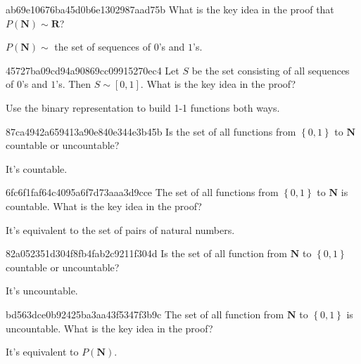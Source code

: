 \begin{note}{ab69e10676ba45d0b6e1302987aad75b}
    What is the key idea in the proof that \({ P(\mathbf{N}) \sim \mathbf{R} }\)?

    \begin{cloze}{1}
        \({ P(\mathbf{N}) \sim }\) the set of sequences of \({ 0 }\)'s and \({ 1 }\)'s.
    \end{cloze}
\end{note}

\begin{note}{45727ba09cd94a90869cc09915270ec4}
    Let \({ S }\) be the set consisting of all sequences of \({ 0 }\)'s and \({ 1 }\)'s.
    Then \({ S \sim [0, 1] }\).
    What is the key idea in the proof?

    \begin{cloze}{1}
        Use the binary representation to build 1-1 functions both ways.
    \end{cloze}
\end{note}

\begin{note}{87ca4942a659413a90e840e344e3b45b}
    Is the set of all functions from \({ \left\{ 0, 1 \right\} }\) to \({ \mathbf{N} }\) countable or uncountable?

    \begin{cloze}{1}
        It's countable.
    \end{cloze}
\end{note}

\begin{note}{6fc6f1faf64c4095a6f7d73aaa3d9cce}
    The set of all functions from \({ \left\{ 0, 1 \right\} }\) to \({ \mathbf{N} }\) is countable.
    What is the key idea in the proof?

    \begin{cloze}{1}
        It's equivalent to the set of pairs of natural numbers.
    \end{cloze}
\end{note}

\begin{note}{82a052351d304f8fb4fab2c9211f304d}
    Is the set of all function from \({ \mathbf{N} }\) to \({ \left\{ 0, 1 \right\} }\) countable or uncountable?

    \begin{cloze}{1}
        It's uncountable.
    \end{cloze}
\end{note}

\begin{note}{bd563dce0b92425ba3aa43f5347f3b9c}
    The set of all function from \({ \mathbf{N} }\) to \({ \left\{ 0, 1 \right\} }\) is uncountable.
    What is the key idea in the proof?

    \begin{cloze}{1}
        It's equivalent to \({ P(\mathbf{N}) }\).
    \end{cloze}
\end{note}

